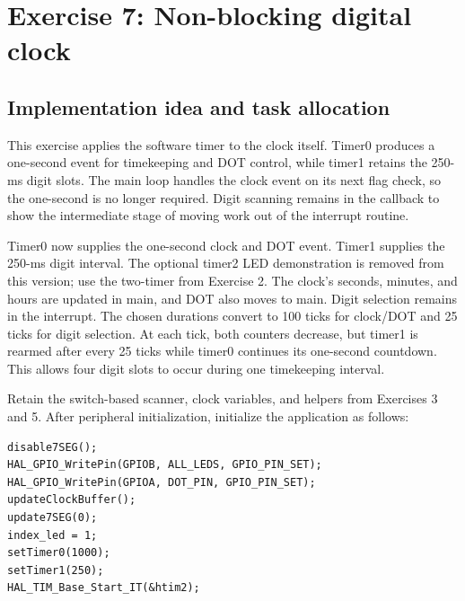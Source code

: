 \documentclass[a4paper]{article}
\newcommand{\code}[1]{\texttt{\detokenize{#1}}}
\newcommand{\topic}[1]{\subsection{#1}}
\begin{document}
\section{Exercise 7: Non-blocking digital clock}
\topic{Implementation idea and task allocation}
This exercise applies the software timer to the clock itself. Timer0 produces
a one-second event for timekeeping and DOT control, while timer1 retains the
250-ms digit slots. The main loop handles the clock event on its next flag
check, so the one-second \code{HAL_Delay()} is no longer required.
Digit scanning remains in the callback to show the intermediate stage of
moving work out of the interrupt routine.

Timer0 now supplies the one-second clock and DOT event. Timer1 supplies the
250-ms digit interval. The optional timer2 LED demonstration is removed from
this version; use the two-timer \code{timer_run()} from Exercise 2.
The clock's seconds, minutes, and hours are updated in main, and DOT also moves
to main. Digit selection remains in the interrupt.
The chosen durations convert to 100 ticks for clock/DOT and 25 ticks for
digit selection. At each tick, both counters decrease, but timer1 is rearmed
after every 25 ticks while timer0 continues its one-second countdown. This
allows four digit slots to occur during one timekeeping interval.

Retain the switch-based scanner, clock variables, and helpers from Exercises
3 and 5. After peripheral initialization, initialize the application as follows:
\par\noindent\begin{minipage}{\linewidth}
\begin{lstlisting}[caption={Non-blocking clock initialization}]
disable7SEG();
HAL_GPIO_WritePin(GPIOB, ALL_LEDS, GPIO_PIN_SET);
HAL_GPIO_WritePin(GPIOA, DOT_PIN, GPIO_PIN_SET);
updateClockBuffer();
update7SEG(0);
index_led = 1;
setTimer0(1000);
setTimer1(250);
HAL_TIM_Base_Start_IT(&htim2);
\end{lstlisting}
\end{minipage}\par
\end{document}
